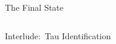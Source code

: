 \documentclass[11pt, xcolor={dvipsnames}, aspectratio=169, notes]{beamer}
\begin{document}
\begin{frame}{The \allbold{\bbtautau} Final State}
\begin{columns}[onlytextwidth]
  \end{columns}
\end{frame}


\begin{frame}[standout]
  Interlude:\ Tau Identification
\end{frame}

\end{document}
